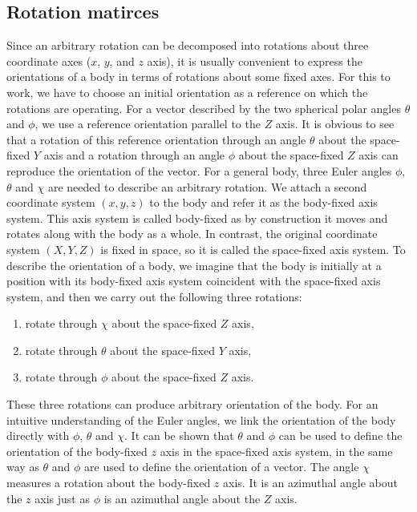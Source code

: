 \subsection{Rotation matirces}

Since an arbitrary rotation can be decomposed into rotations about three coordinate axes ($x$, $y$, and $z$ axis), 
it is usually convenient to express the orientations of a body in terms of rotations about some fixed axes. For this to 
work, we have to choose an initial orientation as a reference on which the rotations are operating. 
For a vector described by the two spherical polar angles $\theta$ and $\phi$, we use a reference orientation parallel 
to the $Z$ axis. It is obvious to see that a rotation of this reference orientation through an angle $\theta$ about 
the space-fixed $Y$ axis and a rotation through an angle $\phi$ about the space-fixed $Z$ axis can reproduce the 
orientation of the vector. For a general body, three Euler angles $\phi$, $\theta$ and $\chi$ are needed to
 describe an arbitrary rotation.
We attach a second coordinate system 
$(x, y, z)$ to the body and refer it as the body-fixed axis system. This axis system is called 
body-fixed as by construction it moves and rotates along with the body as a whole. 
In contrast, the original coordinate system $(X, Y, Z)$ is fixed in space, so it is called the space-fixed axis system. 
To describe the orientation of a body, we imagine that the body is initially at a position with its body-fixed axis system
 coincident with the space-fixed axis system, and then we carry out the following three rotations:
\begin{enumerate}
  \item rotate through $\chi$ about the space-fixed $Z$ axis, 
  \item  rotate through $\theta$ about the space-fixed $Y$ axis,
  \item  rotate through $\phi$ about the space-fixed $Z$ axis. 
\end{enumerate}
These three rotations can produce arbitrary orientation of the body. For an intuitive understanding of the Euler 
angles, we link the orientation of the body directly with $\phi$, $\theta$ and $\chi$. It can be shown that $\theta$ and
$\phi$ can be used to define the orientation of the body-fixed $z$ axis in the space-fixed axis system,  in the same way as
$\theta$ and $\phi$ are used to define the orientation of a vector. The angle $\chi$ measures a rotation about the 
body-fixed $z$ axis. It is an azimuthal angle about the $z$ axis just as $\phi$ is an azimuthal angle about the $Z$ axis. 

